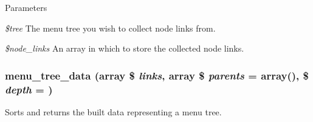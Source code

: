 \begin{DoxyParams}{Parameters}
\item[{\em \$tree}]The menu tree you wish to collect node links from. \item[{\em \$node\_\-links}]An array in which to store the collected node links. \end{DoxyParams}
\hypertarget{group__menu_ga80a5defa3498d4e60321af746c1104c3}{
\subsubsection[{menu\_\-tree\_\-data}]{\setlength{\rightskip}{0pt plus 5cm}menu\_\-tree\_\-data (array \$ {\em links}, \/  array \$ {\em parents} = {\ttfamily array()}, \/  \$ {\em depth} = {})}}
\label{group__menu_ga80a5defa3498d4e60321af746c1104c3}
Sorts and returns the built data representing a menu tree.


